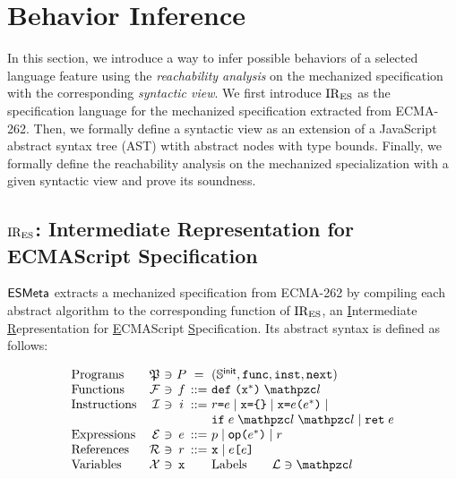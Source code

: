\section{Behavior Inference}\label{sec:infer}

In this section, we introduce a way to infer possible behaviors of a selected
language feature using the \textit{reachability analysis} on the mechanized
specification with the corresponding \textit{syntactic view}.  We first
introduce $\text{IR}_\text{ES}$ as the specification language for the mechanized specification
extracted from ECMA-262.  Then, we formally define a syntactic view as an
extension of a JavaScript abstract syntax tree (AST) wtith abstract nodes with
type bounds.  Finally, we formally define the reachability analysis on the
mechanized specialization with a given syntactic view and prove its soundness.

\subsection{$\text{IR}_\text{ES}$: Intermediate Representation for ECMAScript Specification}

$\esmeta$ extracts a mechanized specification from ECMA-262 by compiling each
abstract algorithm to the corresponding function of $\text{IR}_\text{ES}$, an
\underline{I}ntermediate \underline{R}epresentation for \underline{E}CMAScript
\underline{S}pecification.  Its abstract syntax is defined as follows:

\[
  \begin{array}{lr@{~}c@{~}c@{~}c@{~}l}
    \text{Programs} & \progset &\ni& \prog &=& (\initstset,
    \getfunc, \getinst, \getnext)\\

    \text{Functions} & \funcset &\ni& \func &::=&
    \kwdef \; \kwrl \varx^* \kwrr \; \lab\\

    \text{Instructions} & \instset &\ni& \inst &::=&
    \refer \kweq \expr \mid
    \varx \kweq \kwcl \kwcr \mid
    \varx \kweq \expr \kwrl \expr^* \kwrr \mid \\&&&&&
    \kwif \; \expr \; \lab \; \lab \mid
    \kwret \; \expr\\

    \text{Expressions} & \exprset &\ni& \expr &::=&
    \pval \mid
    \op \kwrl \expr^* \kwrr \mid
    \refer\\

    \text{References} & \referset &\ni& \refer &::=&
    \varx \mid \expr \kwsl \expr \kwsr\\

    \text{Variables} & \varset &\ni& \varx &&

    \text{Labels} \qquad \labset \ni \lab\\
  \end{array}
\]

